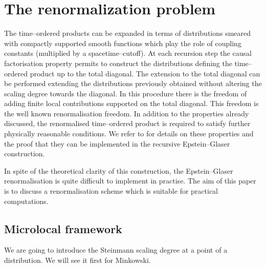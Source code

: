 \documentclass[10pt]{book}
\theoremstyle{break}
\begin{document}
 

 

\chapter{The renormalization problem}


The time--ordered products can be expanded in terms of distributions smeared with compactly supported smooth functions which play the role of coupling constants (multiplied by a spacetime--cutoff). At each recursion step the causal factorisation property %
permits to construct the distributions defining the time--ordered product up to the total diagonal. 
The extension to the total diagonal can be performed extending the distributions previously obtained without altering the scaling degree towards the diagonal. In this procedure there is the freedom of adding finite local contributions supported on the total diagonal. This freedom is the well known renormalisation freedom. In addition to the properties already discussed, the renormalised time--ordered product is required to satisfy further physically reasonable conditions. We refer to %
for details on these properties and the proof that they can be implemented in the recursive Epstein--Glaser construction.

In spite of the theoretical clarity of this construction, the Epstein--Glaser renormalisation is quite difficult to implement in practise. The aim of this paper is to discuss a renormalisation scheme which is suitable for practical computations.



\section{Microlocal framework}


We are going to introduce the Steinmann scaling degree at a point of a distribution. We will see it first for Minkowski.
\end{document}
